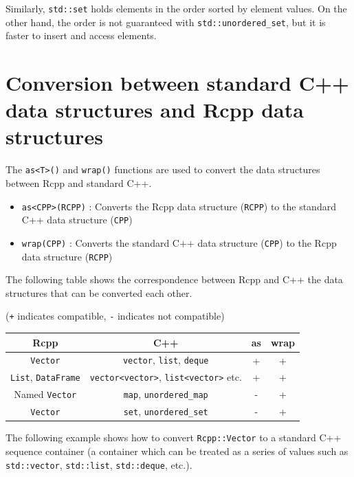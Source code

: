 \documentclass[]{book}
\providecommand{\tightlist}{%
  \setlength{\itemsep}{0pt}\setlength{\parskip}{0pt}}
\begin{document}
Similarly, \texttt{std::set} holds elements in the order sorted by element values. On the other hand, the order is not guaranteed with \texttt{std::unordered\_set}, but it is faster to insert and access elements.

\hypertarget{conversion-between-standard-c-data-structures-and-rcpp-data-structures}{%
\section{Conversion between standard C++ data structures and Rcpp data structures}\label{conversion-between-standard-c-data-structures-and-rcpp-data-structures}}

The \texttt{as\textless{}T\textgreater{}()} and \texttt{wrap()} functions are used to convert the data structures between Rcpp and standard C++.

\begin{itemize}
\tightlist
\item
  \texttt{as\textless{}CPP\textgreater{}(RCPP)} : Converts the Rcpp data structure (\texttt{RCPP}) to the standard C++ data structure (\texttt{CPP})
\item
  \texttt{wrap(CPP)} : Converts the standard C++ data structure (\texttt{CPP}) to the Rcpp data structure (\texttt{RCPP})
\end{itemize}

The following table shows the correspondence between Rcpp and C++ the data structures that can be converted each other.

(\texttt{+} indicates compatible, \texttt{-} indicates not compatible)

\begin{longtable}[]{@{}cccc@{}}
\toprule
Rcpp & C++ & as & wrap\tabularnewline
\midrule
\endhead
\texttt{Vector} & \texttt{vector}, \texttt{list}, \texttt{deque} & + & +\tabularnewline
\texttt{List}, \texttt{DataFrame} & \texttt{vector\textless{}vector\textgreater{}}, \texttt{list\textless{}vector\textgreater{}} etc. & + & +\tabularnewline
Named \texttt{Vector} & \texttt{map}, \texttt{unordered\_map} & - & +\tabularnewline
\texttt{Vector} & \texttt{set}, \texttt{unordered\_set} & - & +\tabularnewline
\bottomrule
\end{longtable}

The following example shows how to convert \texttt{Rcpp::Vector} to a standard C++ sequence container (a container which can be treated as a series of values such as \texttt{std::vector}, \texttt{std::list}, \texttt{std::deque}, etc.).
\end{document}
